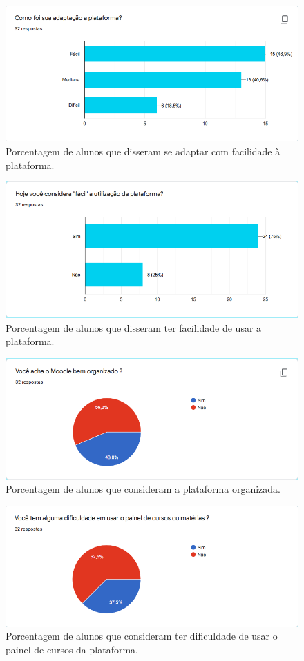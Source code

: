 \documentclass[11pt]{article}
\begin{document}
\setcounter{figure}{0}
\renewcommand{\figurename}{Gráfico}
\begin{figure}[htbp]
\centering
\includegraphics[width=.9\linewidth]{./media/grafico_adaptacao.png}
\caption{\label{fig:org5cccb6b}Porcentagem de alunos que disseram se adaptar com facilidade à plataforma.}
\end{figure}
\begin{figure}[htbp]
\centering
\includegraphics[width=.9\linewidth]{./media/grafico_uso.png}
\caption{\label{fig:orgd20b23b}Porcentagem de alunos que disseram ter facilidade de usar a plataforma.}
\end{figure}
\begin{figure}[htbp]
\centering
\includegraphics[width=.9\linewidth]{./media/grafico_organizacao.png}
\caption{\label{fig:org1e98e17}Porcentagem de alunos que consideram a plataforma organizada.}
\end{figure}
\begin{figure}[htbp]
\centering
\includegraphics[width=.9\linewidth]{./media/grafico_painel.png}
\caption{\label{fig:org7c089d5}Porcentagem de alunos que consideram ter dificuldade de usar o painel de cursos da plataforma.}
\end{figure}
\end{document}
